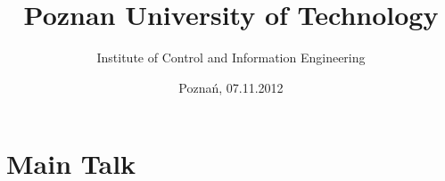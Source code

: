 \documentclass[t,compress]{beamer}
\title[Poznan University of Technology]{Poznan University of Technology}
\author[Institute of Control and Information Engineering]{%
  Institute of Control and Information Engineering\inst{ }
}
\institute[Reasearch activities]{
   \inst{ }%
  Reasearch activity
}
\date[07.11.2012]{Pozna\'n, 07.11.2012}
\begin{document}
\frame{\titlepage}

\part<presentation>{Main Talk}



	





	
\end{document}
